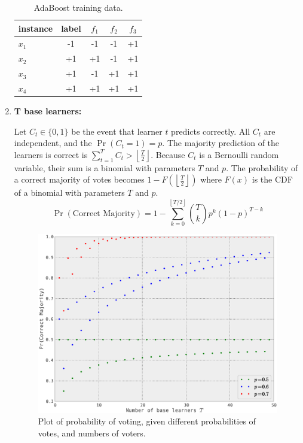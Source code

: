 \documentclass[12pt]{article}
\begin{document}
\begin{enumerate}
\begin{table}[htdp]
\caption{AdaBoost training data.}
\begin{center}
\begin{tabular}{|l|c||c|c|c|}
\hline
instance & label & $f_1$ & $f_2$ & $f_3$ \\
\hline
$x_1$ &  -1 &  -1 &  -1 & +1 \\
$x_2$ & +1 & +1 &  -1 & +1 \\
$x_3$ & +1 &  -1 & +1 & +1 \\
$x_4$ & +1 & +1 & +1 & +1 \\
\hline
\end{tabular}
\end{center}
\label{tab:adaData}
\end{table}%



\item \textbf{T base learners:}

Let $C_t \in \{0,1\}$ be  the event that learner $t$ predicts correctly. All $C_t$ are independent, and the $\Pr(C_t=1) = p$. The majority prediction of the learners is correct is $\sum_{t=1}^TC_t > \left\lfloor \frac{T}{2} \right\rfloor $. Because $C_t$ is a Bernoulli random variable, their sum is a binomial with parameters $T$ and $p$. The probability of a correct majority of votes becomes $1-F\left(\left\lfloor\frac{T}{2}\right\rfloor\right)$ where $F(x)$ is the CDF of a binomial with parameters $T$ and $p$. 
\begin{equation}
\Pr(\text{Correct Majority}) = 1- \sum_{k=0}^{\left\lfloor T/2 \right\rfloor} {T \choose k}p^k(1-p)^{T-k}
\end{equation}

\begin{figure}[htbp]
\begin{center}
\includegraphics[scale=0.55]{prob2.eps}
\caption{Plot of probability of voting, given different probabilities of votes, and numbers of voters.}
\label{fig:prob2}
\end{center}
\end{figure}



\end{enumerate}
\end{document}
